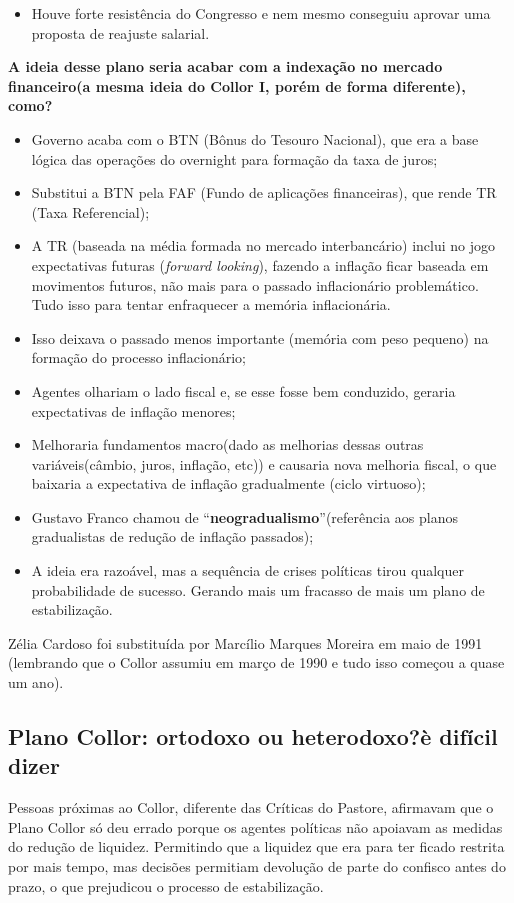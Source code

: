 \documentclass[a4paper,12pt]{article}[abntex2]
\begin{document}
\begin{itemize}
    \item Houve forte resistência do Congresso e nem mesmo conseguiu aprovar uma proposta de reajuste salarial.
\end{itemize}

\textbf{A ideia desse plano seria acabar com a indexação no mercado financeiro(a mesma ideia do Collor I, porém de forma diferente), como?}
\begin{itemize}
    \item Governo acaba com o BTN (Bônus do Tesouro Nacional), que era a base lógica das operações do overnight para formação da taxa de juros;
    \item Substitui a BTN pela FAF (Fundo de aplicações financeiras), que rende TR (Taxa Referencial);
    \item A TR (baseada na média formada no mercado interbancário) inclui no jogo expectativas futuras (\textit{forward looking}), fazendo a inflação ficar baseada em movimentos futuros, não mais para o passado inflacionário problemático. Tudo isso para tentar enfraquecer a memória inflacionária.
    \item Isso deixava o passado menos importante (memória com peso pequeno) na formação do processo inflacionário;
    \item Agentes olhariam o lado fiscal e, se esse fosse bem conduzido, geraria expectativas de inflação menores;
    \item Melhoraria fundamentos macro(dado as melhorias dessas outras variáveis(câmbio, juros, inflação, etc)) e causaria nova melhoria fiscal, o que baixaria a expectativa de inflação gradualmente (ciclo virtuoso);
    \item Gustavo Franco chamou de “\textbf{neogradualismo}”(referência aos planos gradualistas de redução de inflação passados);
    \item A ideia era razoável, mas a sequência de crises políticas tirou qualquer probabilidade de sucesso. Gerando mais um fracasso de mais um plano de estabilização.
\end{itemize}

Zélia Cardoso foi substituída por Marcílio Marques Moreira em maio de 1991 (lembrando que o Collor assumiu em março de 1990 e tudo isso começou a quase um ano).

\subsection{\textbf{Plano Collor: ortodoxo ou heterodoxo?è difícil dizer}}
Pessoas próximas ao Collor, diferente das Críticas do Pastore, afirmavam que o Plano Collor só deu errado porque os agentes políticas não apoiavam as medidas do redução de liquidez. Permitindo que a liquidez que era para ter ficado restrita por mais tempo, mas decisões permitiam devolução de parte do confisco antes do prazo, o que prejudicou o processo de estabilização. 
\end{document}

